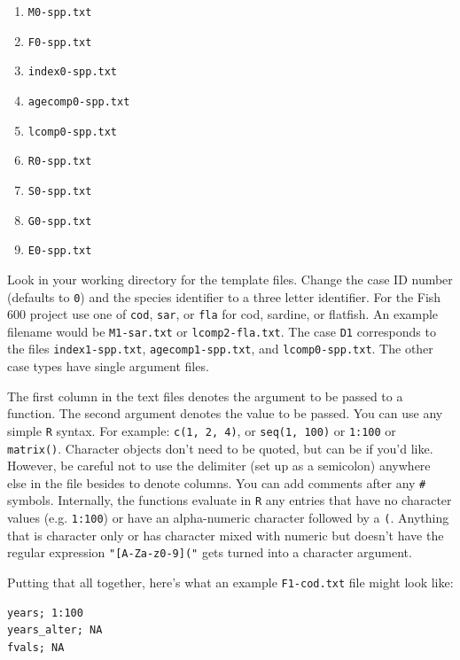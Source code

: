 \documentclass[12pt]{article}
\begin{document}
\begin{enumerate}
  \item \texttt{M0-spp.txt}
  \item \texttt{F0-spp.txt}
  \item \texttt{index0-spp.txt}
  \item \texttt{agecomp0-spp.txt}
  \item \texttt{lcomp0-spp.txt}
  \item \texttt{R0-spp.txt} 
  \item \texttt{S0-spp.txt} 
  \item \texttt{G0-spp.txt} 
  \item \texttt{E0-spp.txt} 
\end{enumerate}

Look in your working directory for the template files. Change the case ID 
number (defaults to \texttt{0}) and the species identifier to a three letter 
identifier. For the Fish 600 project use one of \texttt{cod}, \texttt{sar}, or 
\texttt{fla} for cod, sardine, or flatfish. An example filename would be 
\texttt{M1-sar.txt} or \texttt{lcomp2-fla.txt}. The case \texttt{D1} 
corresponds to the files \texttt{index1-spp.txt}, \texttt{agecomp1-spp.txt}, 
and \texttt{lcomp0-spp.txt}. The other case types have single argument files.

The first column in the text files denotes the argument to be passed to a 
function. The second argument denotes the value to be passed. You can use any 
simple \texttt{R} syntax. For example: \texttt{c(1, 2, 4)}, or \texttt{seq(1, 100)} or 
\texttt{1:100} or \texttt{matrix()}. Character objects don't need to be quoted, 
but can be if you'd like. However, be careful not to use the delimiter (set up 
as a semicolon) anywhere else in the file besides to denote columns. You can 
add comments after any \texttt{\#} symbols. Internally, the functions evaluate 
in \texttt{R} any entries that have no character values (e.g. \texttt{1:100}) or have an 
alpha-numeric character followed by a \texttt{(}. Anything that is character 
only or has character mixed with numeric but doesn't have the regular 
expression \texttt{"[A-Za-z0-9]("} gets turned into a character argument.

Putting that all together, here's what an example \texttt{F1-cod.txt} file 
might look like:

\begin{verbatim}
years; 1:100
years_alter; NA 
fvals; NA
\end{verbatim}
\end{document}

